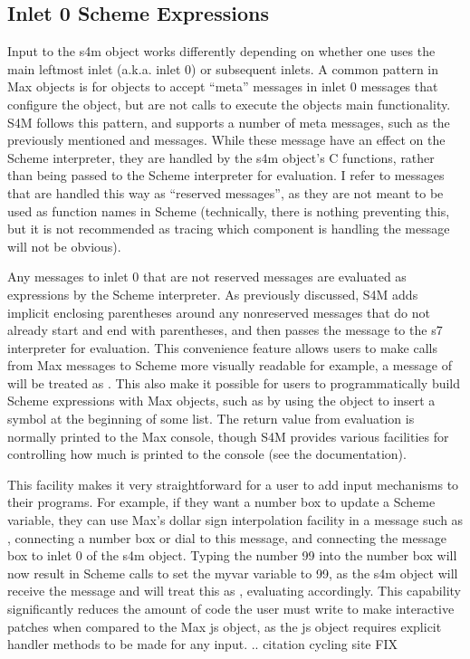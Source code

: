 \documentclass[letterpaper,10pt,english]{sphinxmanual}
\begin{document}
\subsection{Inlet 0 Scheme Expressions}
\label{\detokenize{features_usage:inlet-0-scheme-expressions}}
\sphinxAtStartPar
Input to the s4m object works differently depending on whether one uses the main left\sphinxhyphen{}most inlet (a.k.a. inlet 0) or subsequent inlets.
A common pattern in Max objects is for objects to accept “meta” messages in inlet 0 \sphinxhyphen{} messages that configure the object,
but are not calls to execute the objects main functionality.
S4M follows this pattern, and supports a number of meta messages, such as the previously mentioned  and  messages.
While these message have an effect on the Scheme interpreter, they are handled by the s4m object’s C functions,
rather than being passed to the Scheme interpreter for evaluation.
I refer to messages that are handled this way as “reserved messages”, as they are not meant to be used
as function names in Scheme (technically, there is nothing preventing this, but it is not recommended
as tracing which component is handling the message will not be obvious).

\sphinxAtStartPar
Any messages to inlet 0 that are not reserved messages are evaluated as expressions by the Scheme interpreter.
As previously discussed, S4M adds implicit enclosing parentheses around any non\sphinxhyphen{}reserved messages that do not already start
and end with parentheses, and then passes the message to the s7 interpreter for evaluation.
This convenience feature allows users to make calls from Max messages to Scheme more visually readable \sphinxhyphen{} for example,
a message of  will be treated as . This also make it possible for users
to programmatically build Scheme expressions with Max objects, such as by using the  object to insert
a symbol at the beginning of some list.
The return value from evaluation is normally printed to the Max console, though S4M provides various facilities for controlling
how much is printed to the console (see the documentation).

\sphinxAtStartPar
This facility makes it very straightforward for a user to add input mechanisms to their programs.
For example, if they want a number box to update a Scheme variable, they can use Max’s dollar sign interpolation facility
in a message such as , connecting a number box or dial to this message, and connecting the message box to inlet 0
of the s4m object.
Typing the number 99 into the number box will now result in Scheme calls to set the my\sphinxhyphen{}var variable to 99, as the s4m object
will receive the message  and will treat this as , evaluating accordingly.
This capability significantly reduces the amount of code the user must write to make interactive patches when compared to the Max js object,
as the js object requires explicit handler methods to be made for any input.
.. citation cycling site FIX
\end{document}
